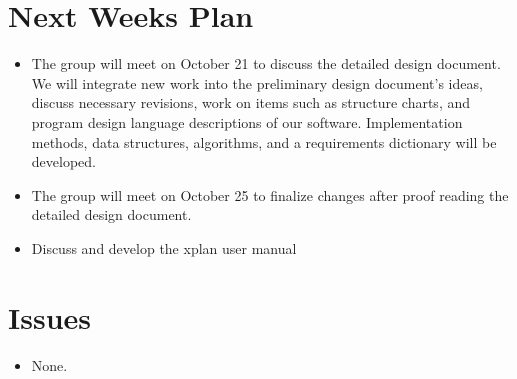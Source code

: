 %
%
%
\section{Next Weeks Plan}
\begin{itemize}
	\item The group will meet on October 21 to discuss the detailed
 design document.  We will integrate new work into the preliminary
design document's ideas, discuss necessary revisions, work on items such as structure
charts, and program design language descriptions of our software.  Implementation
methods, data structures, algorithms, and a requirements dictionary will be developed.
	\item The group will meet on October 25 to finalize changes after proof reading
the detailed design document.
	\item Discuss and develop the xplan user manual
\end{itemize}

%
%
%
\section{Issues}
\begin{itemize}
\item None.
\end{itemize}




